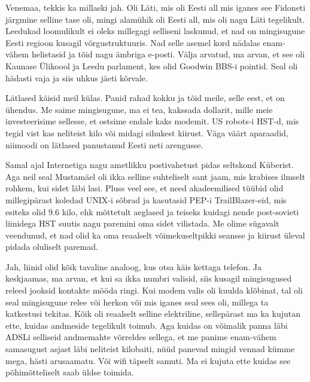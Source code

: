 
Venemaa, tekkis ka millaski jah. Oli Läti, mis oli Eesti all  mis iganes see Fidoneti järgmine selline tase oli, mingi alamühik oli Eesti all, mis oli nagu Läti tegelikult. Leedukad loomulikult ei oleks millegagi selliseni laskunud, et nad on mingisugune Eesti regioon kusagil võrgustruktuuris. Nad selle asemel kord nädalas enam-vähem helistasid ja tõid nagu ämbriga e-posti. Välja arvatud, ma arvan, et see oli Kaunase Ülikoool ja Leedu parlament, kes olid Goodwin BBS-i pointid. Seal oli hädasti vaja ja siis uhkus jäeti kõrvale. 

Lätlased käisid meil külas. Panid rahad kokku ja tõid meile,  selle eest, et on ühendus. Me saime mingisugune, ma ei tea, kakssada dollarit, mille meie investeerisime sellesse, et  ostsime endale kaks modemit. US robots-i  HST-d, mis tegid vist kas neliteist kilo või midagi sihukest kiirust. Väga väärt aparaadid, niimoodi on lätlased panustanud  Eesti neti  arengusse.

Samal ajal Internetiga nagu ametlikku postivahetust pidas seltskond Küberist. Aga neil seal Mustamäel oli ikka selline suhteliselt sant jaam,  mis  krabises ilmselt rohkem, kui sidet läbi lasi. Pluss veel see, et need akadeemilised tüübid olid millegipärast koledad UNIX-i sõbrad ja kasutasid PEP-i TrailBlazer-eid, mis esiteks olid 9.6 kilo, ehk mõttetult aeglased ja teiseks kuidagi nende post-sovieti liinidega HST suutis nagu paremini oma sidet vilistada. Me olime sügavalt veendunud, et nad olid ka oma reaalselt võimekuseltpikki seansse ja kiirust üleval pidada  oluliselt paremad. 


Jah, liinid olid kõik tavaline analoog, kus otsa käis kettaga telefon. Ja keskjaamas, ma arvan, et kui sa ikka numbri valisid, siis kusagil  mingisugused  releed jooksid kontakte mööda ringi. Kui modem valis oli kuulda  klõbinat, tal oli seal mingisugune relee või herkon või mis iganes seal sees oli, millega ta katkestusi tekitas. Kõik oli reaalselt selline elektriline, sellepärast ma ka kujutan ette, kuidas andmeside  tegelikult toimub. Aga  kuidas on võimalik panna läbi ADSLi selliseid andmemahte võrreldes sellega, et me panime enam-vähem samasugust asjast läbi neliteist kilobaiti, nüüd panevad mingid vennad kümme mega, hästi arusaamatu. Või wifi täpselt samuti. Ma ei kujuta ette kuidas see põhimõtteliselt saab üldse toimida. 

